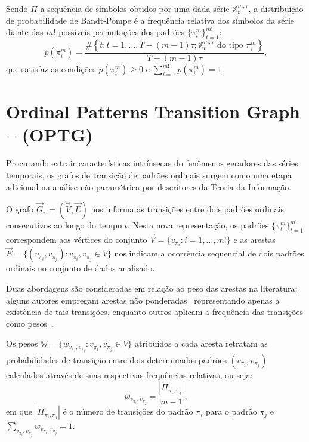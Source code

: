 \documentclass[12pt]{article}
\begin{document}
Sendo $\Pi$ a sequência de símbolos obtidos por uma dada série $\mathbb{X}_t^{m,\tau}$, a distribuição de probabilidade de Bandt-Pompe é a frequência relativa dos símbolos da série diante das $m!$ possíveis permutações dos padrões $\{\pi_t^m\}_{t=1}^{m!}$:
\begin{equation}
    p(\pi_i^m) = \frac{\#\left \{t : t = 1, \dots, T-(m-1)\tau; \mathbb{X}_t^{m,\tau} \text{ do tipo } \pi_i^m\right \}}{T- (m-1)\tau},  
\end{equation}
que satisfaz as condições $p(\pi_i^m) \ge 0$ e  $\sum_{i=1}^{m!} p(\pi_i^m) = 1$.

\section{Ordinal Patterns Transition Graph -- (OPTG)}\label{OPTG}

Procurando extrair características intrínsecas do fenômenos geradores das séries temporais, os grafos de transição de padrões ordinais surgem como uma etapa adicional na análise não-paramétrica por descritores da Teoria da Informação.

O grafo $\vec{G}_{\pi} = (\vec{V}, \vec{E})$ nos informa as transições entre dois padrões ordinais consecutivos ao longo do tempo $t$.
Nesta nova representação, os padrões $\{\pi_t^m\}_{t=1}^{m!}$ correspondem aos vértices do conjunto $\vec{V} = \{ v_{\pi_i}:i = 1, \dots, m!\}$ e as arestas $\vec{E} = \{(v_{\pi_i}, v_{\pi_j}): v_{\pi_i}, v_{\pi_j} \in V\}$ nos indicam a ocorrência sequencial de dois padrões ordinais no conjunto de dados analisado.

Duas abordagens são consideradas em relação ao peso das arestas na literatura: alguns autores empregam arestas não ponderadas~\citep{McCullough2015lagged, Kulp2016ordinal} representando apenas a existência de tais transições, enquanto outros aplicam a frequência das transições como pesos~\citep{Sorrentino2015periodic, Zhang2017ConstructingOP}.


Os pesos $\mathbb{W} = \{w_{v_{\pi_i}, v_{\pi_j}}: v_{\pi_i}, v_{\pi_j} \in V\}$  atribuídos a cada aresta retratam as probabilidades de transição entre dois determinados padrões  $(v_{\pi_i}, v_{\pi_j})$ calculados através de suas respectivas frequências relativas, ou seja:
\begin{equation}
    w_{v_{\pi_i}, v_{\pi_j}} = \frac{|\Pi_{\pi_i,\pi_j}|}{m-1},
\end{equation}
em que $|\Pi_{\pi_i,\pi_j}|$ é o número de transições do padrão $\pi_i$ para o padrão $\pi_j$ e $\sum_{v_{\pi_i}, v_{\pi_j}}w_{v_{\pi_i}, v_{\pi_j}} = 1$.
\end{document}
